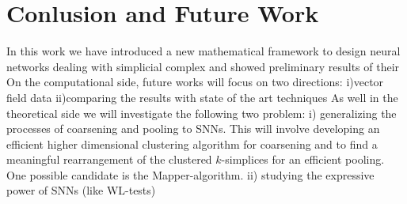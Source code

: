 \section{Conlusion and Future Work}

In this work we have introduced a new mathematical framework to design neural networks dealing with simplicial complex and showed preliminary results of their
On the computational side, future works will focus on two directions: i)vector field data ii)comparing the results with state of the art techniques
As well in the theoretical side we will investigate the following two problem: i) generalizing the processes of coarsening and pooling to SNNs. This will involve developing an efficient higher dimensional clustering algorithm for coarsening and to find a meaningful rearrangement of the clustered $k$-simplices for an efficient pooling. One possible candidate is the Mapper-algorithm. ii) studying the expressive power of SNNs (like WL-tests)  

